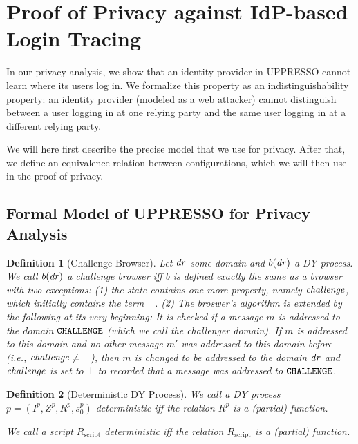 \documentclass[letterpaper,onecolumn,10pt]{article}
\newtheorem{definition}{Definition}
\begin{document}
\section{Proof of Privacy against IdP-based Login Tracing}

In our privacy analysis, we show that an identity provider in UPPRESSO cannot learn 
where its users log in. We formalize this property as an indistinguishability 
property: an identity provider (modeled as a web attacker) cannot distinguish 
between a user logging in at one relying party and the same user logging in at 
a different relying party.

We will here first describe the precise model that we use for privacy.
After that, we define an equivalence relation between configurations,
which we will then use in the proof of privacy.

\subsection{Formal Model of UPPRESSO for Privacy Analysis}

\begin{definition}[Challenge Browser]
  Let $\mathit{dr}$ some domain and $b(\mathit{dr})$ a DY process. 
  We call $b(\mathit{dr})$ a \emph{challenge browser} iff $b$
  is defined exactly the same as a browser with two exceptions: 
  (1) the state contains one more property, namely 
  $\mathit{challenge}$, which initially contains the term $\top$. 
  (2) The broswer's algorithm is extended by the following at 
  its very beginning: It is checked if a message $m$ is 
  addressed to the domain $\mathtt{CHALLENGE}$ (which we call the 
  challenger domain). If $m$ is addressed to this domain and 
  no other message $m'$ was addressed to this domain before 
  (i.e., $\mathit{challenge} \not\equiv \bot$), then $m$ is changed 
  to be addressed to the domain $\mathit{dr}$ and $\mathit{challenge}$ 
  is set to $\bot$ to recorded that a message was addressed to 
  $\mathtt{CHALLENGE}$.
\end{definition}

\begin{definition}[Deterministic DY Process]
  We call a DY process $p = (I^p,Z^p,R^p,s_0^p)$ \emph{deterministic} iff 
  the relation $R^p$ is a (partial) function.

  We call a script $R_\text{script}$ \emph{deterministic} iff the relation 
  $R_\text{script}$ is a (partial) function.
\end{definition}
\end{document}
